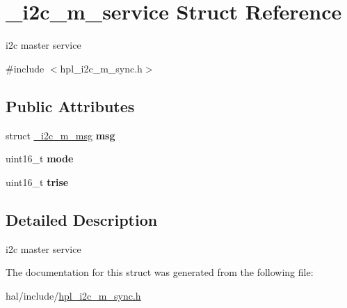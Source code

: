 \hypertarget{struct__i2c__m__service}{}\section{\+\_\+i2c\+\_\+m\+\_\+service Struct Reference}
\label{struct__i2c__m__service}


i2c master service  




{\ttfamily \#include $<$hpl\+\_\+i2c\+\_\+m\+\_\+sync.\+h$>$}

\subsection*{Public Attributes}
\begin{DoxyCompactItemize}
\item 
\mbox{\label{struct__i2c__m__service_a4a045e195a49657eb4d5816a7631b292}} 
struct \hyperlink{struct__i2c__m__msg}{\+\_\+i2c\+\_\+m\+\_\+msg} {\bfseries msg}
\item 
\mbox{\label{struct__i2c__m__service_a69f316631c292b25b96ab298ba99fb7f}} 
uint16\+\_\+t {\bfseries mode}
\item 
\mbox{\label{struct__i2c__m__service_a2dbca89c20d4397327425db068b77a07}} 
uint16\+\_\+t {\bfseries trise}
\end{DoxyCompactItemize}


\subsection{Detailed Description}
i2c master service 

The documentation for this struct was generated from the following file\+:\begin{DoxyCompactItemize}
\item 
hal/include/\hyperlink{hpl__i2c__m__sync_8h}{hpl\+\_\+i2c\+\_\+m\+\_\+sync.\+h}\end{DoxyCompactItemize}
